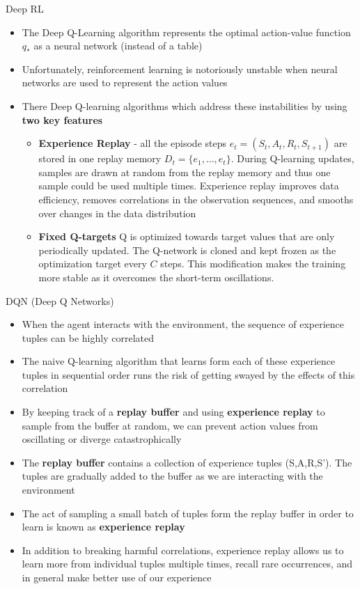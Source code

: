 \documentclass[10pt,mathserif]{beamer}
\begin{document}
\begin{frame}{Deep RL}
\begin{itemize}
\item The Deep Q-Learning algorithm represents the optimal action-value function $q_*$ as a neural network (instead
of a table)
\item Unfortunately, reinforcement learning is notoriously unstable when neural networks are used to represent the
action values
\item There Deep Q-learning algorithms which address these instabilities by using \textbf{two key features}
\begin{itemize}
\item \textbf{Experience Replay} - all the episode steps $e_t = (S_t, A_t, R_t, S_{t+1})$ are stored in one replay memory
$D_t = \{e_1,\dots,e_t\}$. During Q-learning updates, samples are drawn at random from the replay memory and thus one sample could be used multiple times. Experience replay improves data efficiency, removes correlations in the
observation sequences, and smooths over changes in the data distribution
\item \textbf{Fixed Q-targets} Q is optimized towards target values that are only periodically updated. The Q-network is cloned and kept frozen as the optimization target every $C$ steps. This modification makes the training more stable as it overcomes the short-term oscillations.
\end{itemize} 
\end{itemize}
\end{frame}

\begin{frame}{DQN (Deep Q Networks)}
\begin{itemize}
\item When the agent interacts with the environment, the sequence of experience tuples can be highly correlated
\item The naive Q-learning algorithm that learns form each of these experience tuples in sequential order runs the
risk of getting swayed by the effects of this correlation
\item By keeping track of a \textbf{replay buffer} and using \textbf{experience replay} to sample from the buffer at
random, we can prevent action values from oscillating or diverge catastrophically
\item The \textbf{replay buffer} contains a collection of experience tuples (S,A,R,S'). The tuples are gradually added to the buffer as we are interacting with the environment
\item The act of sampling a small batch of tuples form the replay buffer in order to learn is known as 
\textbf{experience replay}
\item In addition to breaking harmful correlations, experience replay allows us to learn more from individual tuples
multiple times, recall rare occurrences, and in general make better use of our experience
\end{itemize}
\end{frame}
\end{document}
